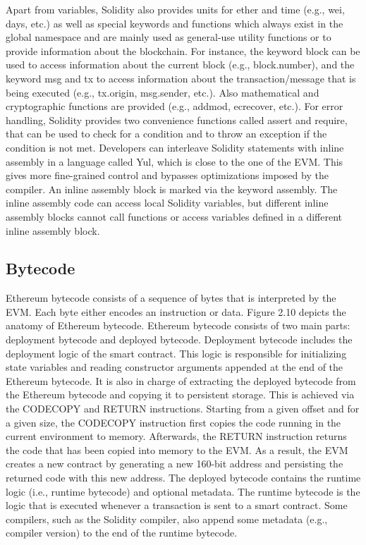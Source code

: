         Apart from variables, Solidity also provides units for ether and time (e.g., wei, days, etc.) as well as special keywords and functions which always exist in the global namespace and are mainly used as general-use utility functions or to provide information about the blockchain.
        For instance, the keyword block can be used to access information about the current block (e.g., block.number), and the keyword msg and tx to access information about the transaction/message that is being executed (e.g., tx.origin, msg.sender, etc.).
        Also mathematical and cryptographic functions are provided (e.g., addmod, ecrecover, etc.).
        For error handling, Solidity provides two convenience functions called assert and require, that can be used to check for a condition and to throw an exception if the condition is not met.
        Developers can interleave Solidity statements with inline assembly in a language called Yul, which is close to the one of the EVM.
        This gives more fine-grained control and bypasses optimizations imposed by the compiler.
        An inline assembly block is marked via the keyword assembly.
        The inline assembly code can access local Solidity variables, but different inline assembly blocks cannot call functions or access variables defined in a different inline assembly block.

    \subsection{Bytecode}
        Ethereum bytecode consists of a sequence of bytes that is interpreted by the EVM.
        Each byte either encodes an instruction or data.
        Figure 2.10 depicts the anatomy of Ethereum bytecode.
        Ethereum bytecode consists of two main parts: deployment bytecode and deployed bytecode.
        Deployment bytecode includes the deployment logic of the smart contract.
        This logic is responsible for initializing state variables and reading constructor arguments appended at the end of the Ethereum bytecode.
        It is also in charge of extracting the deployed bytecode from the Ethereum bytecode and copying it to persistent storage.
        This is achieved via the CODECOPY and RETURN instructions.
        Starting from a given offset and for a given size, the CODECOPY instruction first copies the code running in the current environment to memory.
        Afterwards, the RETURN instruction returns the code that has been copied into memory to the EVM.
        As a result, the EVM creates a new contract by generating a new 160-bit address and persisting the returned code with this new address.
        The deployed bytecode contains the runtime logic (i.e., runtime bytecode) and optional metadata.
        The runtime bytecode is the logic that is executed whenever a transaction is sent to a smart contract.
        Some compilers, such as the Solidity compiler, also append some metadata (e.g., compiler version) to the end of the runtime bytecode.


